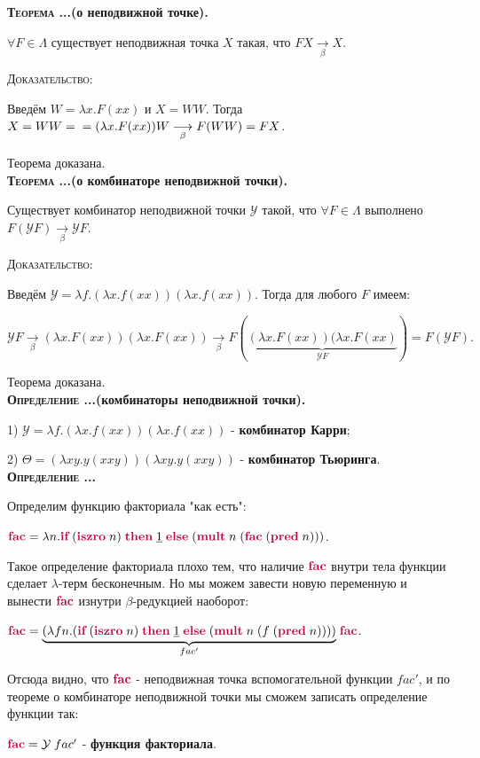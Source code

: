 \documentclass[18pt, a4paper]{extarticle}
\newcounter{par}
\newcounter{spar}
\newcounter{zap}
\newcommand{\opr}{\textbf{\textsc{Определение \thepar.\if\thespar1\thespar.\fi\thezap.\;}}\stepcounter{zap}}
\newcommand{\oprT}[1]{\textbf{\textsc{Определение \thepar.\if\thespar1\thespar.\fi\thezap.}(#1).}\stepcounter{zap}}
\newcommand{\teorT}[1]{\textbf{\textsc{Теорема \thepar.\if\thespar1\thespar.\fi\thezap.}(#1).}\stepcounter{zap}}
\newcommand{\dok}{\textsc{Доказательство:}}
\newcommand{\lm}{\lambda}
\newcommand{\lmb}{\Lambda}
\newcommand{\ky}{\mathcal{Y}}
\newcommand{\redb}{\underset{\beta}{\longrightarrow}}
\newcommand{\lfunction}[1]{\textcolor{purple}{\textbf{#1}}}
\newcommand{\churchnum}[1]{{\underline{#1}}}
\begin{document}
\teorT{о неподвижной точке}

$\forall F \in \lmb$ существует неподвижная точка $X$ такая, что $FX \redb X$.

\dok

Введём $W=\lm x.F(xx) \text{ и } X=WW$. Тогда $X=WW=\newline=(\lm x.F(xx))W\redb F(WW)=FX$.

Теорема доказана.\\

\teorT{о комбинаторе неподвижной точки}

Существует комбинатор неподвижной точки $\ky$ такой, что $\forall F\in\lmb$ выполнено $F(\ky F)\redb\ky F$.

\dok

Введём $\ky = \lm f.(\lm x.f(xx))(\lm x.f(xx))$. Тогда для любого $F$ имеем:

$\ky F\redb (\lm x.F(xx))(\lm x.F(xx))\redb F(\underset{\ky F}{\underbrace{(\lm x.F(xx))(\lm x.F(xx)}})=F(\ky F).$

Теорема доказана.\\

\oprT{комбинаторы неподвижной точки}

1) $\ky=\lm f.(\lm x.f(xx))(\lm x.f(xx))$ - \textbf{комбинатор Карри};

2) $\Theta=(\lm xy.y(xxy))(\lm xy.y(xxy))$ - \textbf{комбинатор Тьюринга}.\\

\opr

Определим функцию факториала "как есть":

$\lfunction{fac}=\lm n.\lfunction{if}\;(\lfunction{iszro}\; n)\;\lfunction{then}\;\churchnum{1}\;\lfunction{else}\;(\lfunction{mult}\;n\;(\lfunction{fac}\;(\lfunction{pred}\;n)))$.

Такое определение факториала плохо тем, что наличие $\lfunction{fac}$ внутри тела функции сделает $\lm$-терм бесконечным. Но мы можем завести новую переменную и вынести $\lfunction{fac}$ изнутри $\beta$-редукцией наоборот:

$\lfunction{fac}=\underset{fac'}{\underbrace{(\lm fn.(\lfunction{if}\;(\lfunction{iszro}\; n)\;\lfunction{then}\;\churchnum{1}\;\lfunction{else}\;(\lfunction{mult}\;n\;(f\;(\lfunction{pred}\;n))))}}\;\lfunction{fac}$.

Отсюда видно, что $\lfunction{fac}$ - неподвижная точка вспомогательной функции $fac'$, и по теореме о комбинаторе неподвижной точки мы сможем записать определение функции так:

$\lfunction{fac} = \ky\;fac'$ - \textbf{функция факториала}.\\
\end{document}
